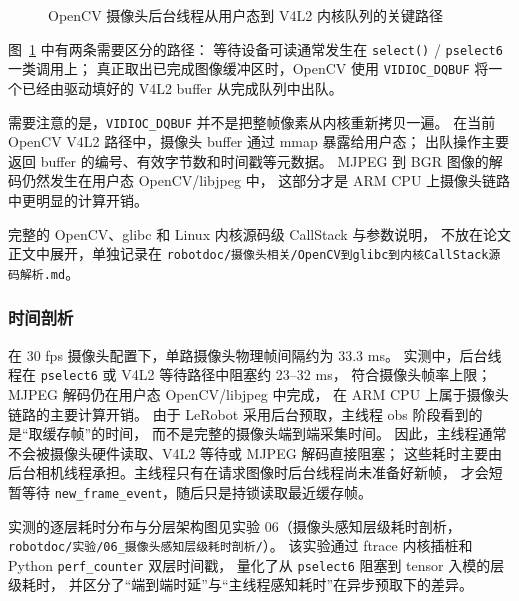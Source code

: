 \begin{figure}[htbp]
  \caption{OpenCV 摄像头后台线程从用户态到 V4L2 内核队列的关键路径}
  \label{fig:opencv-v4l2-callstack}
\end{figure}

图~\ref{fig:opencv-v4l2-callstack} 中有两条需要区分的路径：
等待设备可读通常发生在 \texttt{select()} / \texttt{pselect6} 一类调用上；
真正取出已完成图像缓冲区时，OpenCV 使用 \texttt{VIDIOC\_DQBUF} 将一个已经由驱动填好的
V4L2 buffer 从完成队列中出队。

需要注意的是，\texttt{VIDIOC\_DQBUF} 并不是把整帧像素从内核重新拷贝一遍。
在当前 OpenCV V4L2 路径中，摄像头 buffer 通过 mmap 暴露给用户态；
出队操作主要返回 buffer 的编号、有效字节数和时间戳等元数据。
MJPEG 到 BGR 图像的解码仍然发生在用户态 OpenCV/libjpeg 中，
这部分才是 ARM CPU 上摄像头链路中更明显的计算开销。

完整的 OpenCV、glibc 和 Linux 内核源码级 CallStack 与参数说明，
不放在论文正文中展开，单独记录在
\texttt{robotdoc/摄像头相关/OpenCV到glibc到内核CallStack源码解析.md}。

\subsubsection{时间剖析}

在 30 fps 摄像头配置下，单路摄像头物理帧间隔约为 33.3 ms。
实测中，后台线程在 \texttt{pselect6} 或 V4L2 等待路径中阻塞约 23--32 ms，
符合摄像头帧率上限；MJPEG 解码仍在用户态 OpenCV/libjpeg 中完成，
在 ARM CPU 上属于摄像头链路的主要计算开销。
由于 LeRobot 采用后台预取，主线程 obs 阶段看到的是“取缓存帧”的时间，
而不是完整的摄像头端到端采集时间。
因此，主线程通常不会被摄像头硬件读取、V4L2 等待或 MJPEG 解码直接阻塞；
这些耗时主要由后台相机线程承担。主线程只有在请求图像时后台线程尚未准备好新帧，
才会短暂等待 \texttt{new\_frame\_event}，随后只是持锁读取最近缓存帧。

实测的逐层耗时分布与分层架构图见实验 06（摄像头感知层级耗时剖析，
\texttt{robotdoc/实验/06\_摄像头感知层级耗时剖析/}）\label{exp:06}。
该实验通过 ftrace 内核插桩和 Python \texttt{perf\_counter} 双层时间戳，
量化了从 \texttt{pselect6} 阻塞到 tensor 入模的层级耗时，
并区分了“端到端时延”与“主线程感知耗时”在异步预取下的差异。


